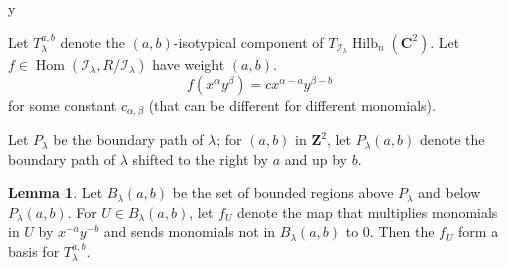 y\documentclass{amsart}[12pt]
\theoremstyle{definition}
\newtheorem{lemma}[dummy]{Lemma}
\newcommand{\Z}{\mathbf{Z}}
\newcommand{\C}{\mathbf{C}}
\DeclareMathOperator{\Hilb}{Hilb}
\DeclareMathOperator{\Hom}{Hom}
\begin{document}
Let $T_\lambda^{a,b}$ denote the $(a,b)$-isotypical component of $T_{\mathcal{I}_\lambda}\Hilb_n(\C^2)$.  Let $f\in\Hom(\mathcal{I}_\lambda, R/\mathcal{I}_\lambda)$ have weight $(a,b)$.
$$f(x^{\alpha}y^\beta)=cx^{\alpha-a}y^{\beta-b}$$
for some constant $c_{\alpha, \beta}$ (that can be different for different monomials).  


Let $P_\lambda$ be the boundary path of $\lambda$; for $(a,b)$ in $\Z^2$, let $P_\lambda(a,b)$ denote the boundary path of $\lambda$ shifted to the right by $a$ and up by $b$.

\begin{lemma} Let $B_\lambda(a,b)$ be the set of bounded regions above $P_\lambda$ and below $P_\lambda(a,b)$.  For $U\in B_\lambda(a,b)$, let $f_U$ denote the map that multiplies monomials in $U$ by $x^{-a}y^{-b}$ and sends monomials not in $B_\lambda(a,b)$ to $0$.  Then the $f_U$ form a basis for $T_\lambda^{a,b}$.
\end{lemma}
\end{document}
